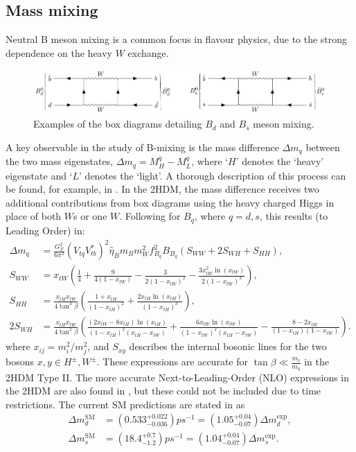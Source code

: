 \documentclass[a4paper,12pt]{article}
\begin{document}
\subsection{Mass mixing}
\label{subsec:mix}
Neutral B meson mixing is a common focus in flavour physics, due to the strong dependence on the heavy $W$ exchange. 
\begin{figure}[ht]
    \centering
    \includegraphics[scale=1.0,trim=12em 44.5em 8em 12em,clip]{bmix.pdf}
    \caption{\label{fig:bmix} Examples of the box diagrams detailing $B_d$ and $B_s$ meson mixing.}
\end{figure}
A key observable in the study of B-mixing is the mass difference $\Delta m_q$ between the two mass eigenstates, $\Delta m_q = M_H^q - M_L^q$, where `$H$' denotes the `heavy' eigenstate and `$L$' denotes the `light'. 
A thorough description of this process can be found, for example, in \cite{mix15}.
In the 2HDM, the mass difference receives two additional contributions from box diagrams using the heavy charged Higgs in place of both $W$s or one $W$. 
Following \cite{frank} for $B_q$, where $q=d,s$, this results (to Leading Order) in:
\begin{align}
    \Delta m_q &= \frac{G_F^2}{6\pi^2}(V_{tq}V_{tb}^*)^2\hat{\eta}_Bm_Bm_W^2f_{B_q}^2B_{B_q}(S_{WW}+2S_{WH}+S_{HH}), \\
    S_{WW} &= x_{tW}\left(\frac14+\frac{9}{4(1-x_{tW})}-\frac{3}{2(1-x_{tW})^2}-\frac{3x_{tW}^2\ln(x_{tW})}{2(1-x_{tW})^3}\right), \\
    S_{HH} &= \frac{x_{tH}x_{tW}}{4\tan^4\beta}\left(\frac{1+x_{tH}}{(1-x_{tH})^2}+\frac{2x_{tH}\ln(x_{tH})}{(1-x_{tH})^3}\right),\\
    2S_{WH} &= \frac{x_{tH}x_{tW}}{4\tan^2\beta}\left(\frac{(2x_{tW}-8x_{tH})\ln(x_{tH})}{(1-x_{tH})^2(x_{tH}-x_{tW})}+\frac{6x_{tW}\ln(x_{tW})}{(1-x_{tW})^2(x_{tH}-x_{tW})}-\frac{8-2x_{tW}}{(1-x_{tH})(1-x_{tW})}\right).
\end{align}
where $x_{ij} = m_i^2/m_j^2$, and $S_{xy}$ describes the internal bosonic lines for the two bosons $x,y \in H^\pm,W^\pm$.
These expressions are accurate for $\tan\beta\ll\frac{m_t}{m_b}$ in the 2HDM Type II.
The more accurate Next-to-Leading-Order (NLO) expressions in the 2HDM are also found in \cite{frank}, but these could not be included due to time restrictions.
The current SM predictions are stated in \cite{bmix} as
\begin{align}
    \Delta m^{\text{SM}}_d &= \left(0.533^{+0.022}_{-0.036}\right)ps^{-1} = \left(1.05^{+0.04}_{-0.07}\right)\Delta m_d^{\text{exp}}, \\
    \Delta m^{\text{SM}}_s &= \left(18.4^{+0.7}_{-1.2}\right)ps^{-1} = \left(1.04^{+0.04}_{-0.07}\right)\Delta m_s^{\text{exp}}.
\end{align}
\end{document}
